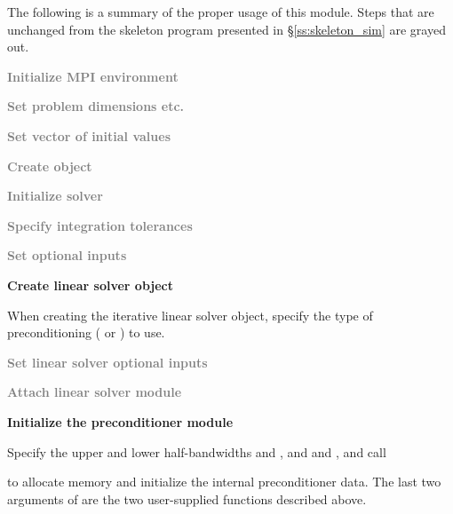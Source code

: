 The following is a summary of the proper usage of this module. Steps that are
unchanged from the skeleton program presented in \S\ref{ss:skeleton_sim} are grayed out.
\begin{Steps}
\item
  \textcolor{gray}{\bf Initialize MPI environment}

\item
  \textcolor{gray}{\bf Set problem dimensions etc.}

\item
  \textcolor{gray}{\bf Set vector of initial values}

\item
  \textcolor{gray}{\bf Create {\cvode} object}

\item
  \textcolor{gray}{\bf Initialize {\cvode} solver}

\item
  \textcolor{gray}{\bf Specify integration tolerances}

\item
  \textcolor{gray}{\bf Set optional inputs}

\item
  {\bf Create linear solver object}

  When creating the iterative linear solver object, specify the type
  of preconditioning ( or ) to use.

\item
  \textcolor{gray}{\bf Set linear solver optional inputs}

\item \label{i:bbdpre_attach}
  \textcolor{gray}{\bf Attach linear solver module}

\item \label{i:bbdpre_init}
  {\bf Initialize the {\cvbbdpre} preconditioner module}

  Specify the upper and lower half-bandwidths  and , and
   and , and call


   to allocate memory and initialize the internal preconditioner data.
   The last two arguments of  are the two user-supplied
   functions described above.


\end{Steps}
